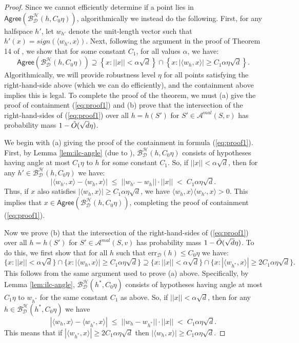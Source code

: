 \documentclass[11pt]{article}
\newcommand{\err}{\mathrm{err}}
\newcommand{\0}{\mathbf{0}}
\newcommand{\1}{\mathbf{1}}
\newcommand{\cA}{\mathcal{A}}
\newcommand{\cB}{\mathcal{B}}
\newcommand{\cD}{\mathcal{D}}
\newcommand{\cH}{\mathcal{H}}
\newcommand{\Agree}{\mathsf{Agree}}
\begin{document}
\begin{proof}
Since we cannot efficiently determine if a point lies in $\Agree(\cB^{\cH}_{\cD}(h,C_0\eta))$, algorithmically we instead do the following.  First, for any halfspace $h'$, let $w_{h'}$ denote the unit-length vector such that $h'(x)=sign(\langle w_{h'}, x\rangle)$.  Next, following the argument in the proof of Theorem 14 of \cite{balcan2013active}, we show that for some constant $C_1$, for all values $\alpha$, we have:
\begin{equation}
\Agree\left(\cB^{\cH}_{\cD}(h,C_0\eta)\right)\supseteq \left\{x : ||x|| < \alpha\sqrt{d}\right\}\cap \left\{x :|\langle w_h, x\rangle|\ge C_1\alpha\eta\sqrt{d}\right\}.
\label{eq:proof1}
\end{equation}
Algorithmically, we will provide robustness level $\eta$ for all points satisfying the right-hand-side above (which we can do efficiently), and the containment above implies this is legal. To complete the proof of the theorem, we must (a) give the proof of containment (\ref{eq:proof1}) and (b) prove that the intersection of the right-hand-sides of  (\ref{eq:proof1}) over all $h=h(S')$ for $S' \in \cA^{mal}(S,v)$ has probability mass
$1-\Tilde{O}(\sqrt{d}\eta)$.

We begin with (a) giving the proof of the containment in formula (\ref{eq:proof1}).
First, by Lemma \ref{lem:ilc-angle}  (due to \cite{balcan2013active}), $\cB^{\cH}_{\cD}(h,C_0\eta)$ consists of hypotheses having angle at most $C_1\eta$ to $h$ for some constant $C_1$. So, if
$||x|| < \alpha\sqrt{d}$, then for any $h' \in \cB^{\cH}_{\cD}(h,C_0\eta)$ we have:
$$
    |\langle w_{h'}, x\rangle - \langle w_h, x\rangle| \; \le \; ||w_{h'}-w_h||\cdot||x|| \; < \; C_1\alpha\eta\sqrt{d}.
$$
Thus, if $x$ also satisfies $|\langle w_h, x\rangle| \ge C_1\alpha\eta\sqrt{d}$, we have $\langle w_h, x\rangle\langle w_{h'}, x\rangle > 0$. This implies that $x \in \Agree\left(\cB^{\cH}_{\cD}(h,C_0\eta)\right)$, completing the proof of containment (\ref{eq:proof1}).

Now we prove (b) that the intersection of the right-hand-sides of  (\ref{eq:proof1}) over all $h=h(S')$ for $S' \in \cA^{mal}(S,v)$ has probability mass
$1-\Tilde{O}(\sqrt{d}\eta)$.  To do this, we first show that for all $h$ such that $\err_\cD(h) \leq C_0\eta$ we have:
\begin{equation}
\{x : ||x|| < \alpha\sqrt{d}\}\cap\{x :|\langle w_h, x\rangle|\ge C_1\alpha\eta\sqrt{d}\}
\supseteq
\{x : ||x|| < \alpha\sqrt{d}\}\cap\{x :|\langle w_{h^*}, x\rangle|\ge 2C_1\alpha\eta\sqrt{d}\}.
\label{eq:proof2}
\end{equation}
This follows from the same argument used to prove (a) above.  Specifically, by Lemma \ref{lem:ilc-angle}, $\cB^{\cH}_{\cD}(h^*,C_0\eta)$ consists of hypotheses having angle at most $C_1\eta$ to $w_{h^*}$ for the same constant $C_1$ as above. So, if
$||x|| < \alpha\sqrt{d}$, then for any $h \in \cB^{\cH}_{\cD}(h^*,C_0\eta)$ we have
$$    |\langle w_h, x\rangle - \langle w_{h^*}, x\rangle| \; \le \; ||w_h-w_{h^*}||\cdot||x|| \; < \; C_1\alpha\eta\sqrt{d}.$$  
This means that if $|\langle w_{h^*}, x\rangle|\ge 2C_1\alpha\eta\sqrt{d}$ then $|\langle w_h, x\rangle|\ge C_1\alpha\eta\sqrt{d}$.


\end{proof}
\end{document}
